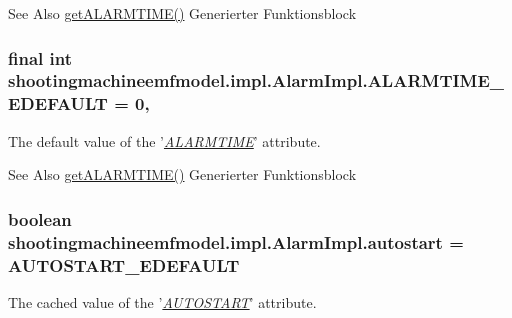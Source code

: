 \begin{DoxySeeAlso}{See Also}
\hyperlink{classshootingmachineemfmodel_1_1impl_1_1_alarm_impl_ac79556c6b3f364973719c580860200b3}{get\-A\-L\-A\-R\-M\-T\-I\-M\-E()} Generierter Funktionsblock  
\end{DoxySeeAlso}
\hypertarget{classshootingmachineemfmodel_1_1impl_1_1_alarm_impl_ab1311546de8d5b8a4a39f776185907f8}{
\subsubsection[{A\-L\-A\-R\-M\-T\-I\-M\-E\-\_\-\-E\-D\-E\-F\-A\-U\-L\-T}]{\setlength{\rightskip}{0pt plus 5cm}final int shootingmachineemfmodel.\-impl.\-Alarm\-Impl.\-A\-L\-A\-R\-M\-T\-I\-M\-E\-\_\-\-E\-D\-E\-F\-A\-U\-L\-T = 0\hspace{0.3cm}{\ttfamily [static]}, {\ttfamily [protected]}}}\label{classshootingmachineemfmodel_1_1impl_1_1_alarm_impl_ab1311546de8d5b8a4a39f776185907f8}
The default value of the '\hyperlink{classshootingmachineemfmodel_1_1impl_1_1_alarm_impl_ac79556c6b3f364973719c580860200b3}{{\itshape A\-L\-A\-R\-M\-T\-I\-M\-E}}' attribute.

\begin{DoxySeeAlso}{See Also}
\hyperlink{classshootingmachineemfmodel_1_1impl_1_1_alarm_impl_ac79556c6b3f364973719c580860200b3}{get\-A\-L\-A\-R\-M\-T\-I\-M\-E()} Generierter Funktionsblock  
\end{DoxySeeAlso}
\hypertarget{classshootingmachineemfmodel_1_1impl_1_1_alarm_impl_afc1bb0e74f4c4da81e00d2263997fb2f}{
\subsubsection[{autostart}]{\setlength{\rightskip}{0pt plus 5cm}boolean shootingmachineemfmodel.\-impl.\-Alarm\-Impl.\-autostart = {\bf A\-U\-T\-O\-S\-T\-A\-R\-T\-\_\-\-E\-D\-E\-F\-A\-U\-L\-T}\hspace{0.3cm}{\ttfamily [protected]}}}\label{classshootingmachineemfmodel_1_1impl_1_1_alarm_impl_afc1bb0e74f4c4da81e00d2263997fb2f}
The cached value of the '\hyperlink{classshootingmachineemfmodel_1_1impl_1_1_alarm_impl_abf52c0d2ad03e0367f3f315a4683c14f}{{\itshape A\-U\-T\-O\-S\-T\-A\-R\-T}}' attribute.

